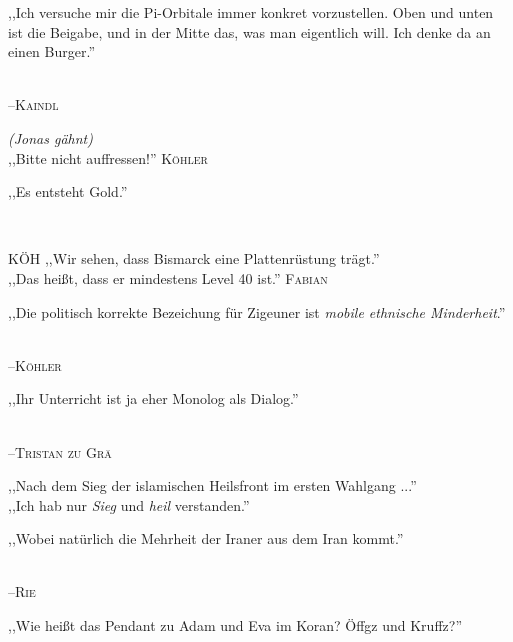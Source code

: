 \vspace{3mm}
{\raggedright ,,Ich versuche mir die Pi-Orbitale immer konkret vorzustellen. Oben und unten ist die Beigabe, und in der Mitte das, was man eigentlich will. Ich denke da an einen Burger.''}\\
\raggedleft \textsc{\footnotesize --\/Kaindl}\\

\vspace{3mm}
\raggedright \emph{\footnotesize (Jonas gähnt)}\\
\raggedleft ,,Bitte nicht auffressen!'' \textsc{\footnotesize Köhler}\\

\vspace{3mm}
{\raggedright ,,Es entsteht Gold.''}\\

\vspace{3mm}
\hangindent=0.7cm
\raggedright \textsc{\footnotesize KÖH} ,,Wir sehen, dass Bismarck eine Plattenrüstung trägt.''\\
\raggedleft ,,Das heißt, dass er mindestens Level 40 ist.'' \textsc{\footnotesize Fabian}\\

\vspace{3mm}
{\raggedright ,,Die politisch korrekte Bezeichung für Zigeuner ist \emph{mobile ethnische Minderheit}.''}\\
\raggedleft \textsc{\footnotesize --\/Köhler}\\

\vspace{3mm}
{\raggedright ,,Ihr Unterricht ist ja eher Monolog als Dialog.''}\\
\raggedleft \textsc{\footnotesize --\/Tristan zu Grä}\\

\vspace{3mm}
\hangindent=0.7cm
\raggedright \textsc{\footnotesize } ,,Nach dem Sieg der islamischen Heilsfront im ersten Wahlgang ...''\\
\raggedleft ,,Ich hab nur \emph{Sieg} und \emph{heil} verstanden.'' \textsc{\footnotesize }\\

\vspace{3mm}
{\raggedright ,,Wobei natürlich die Mehrheit der Iraner aus dem Iran kommt.''}\\
\raggedleft \textsc{\footnotesize --\/Rie}\\

\vspace{3mm}
{\raggedright ,,Wie heißt das Pendant zu Adam und Eva im Koran? Öffgz und Kruffz?''}\\

